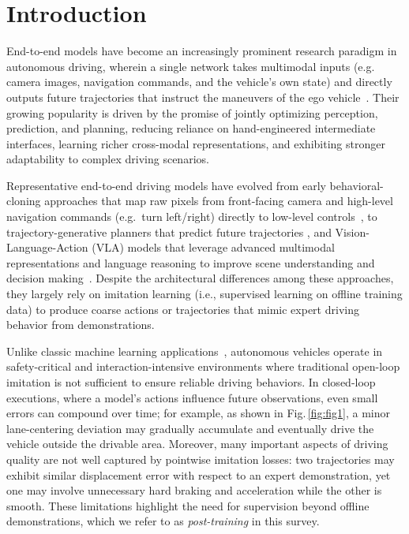 \documentclass[runningheads]{llncs}
\begin{document}
\section{Introduction}
\label{sec:intro}

End-to-end models have become an increasingly prominent research paradigm in autonomous driving, wherein a single network takes multimodal inputs (e.g.\, camera images, navigation commands, and the vehicle's own state) and directly outputs future trajectories that instruct the maneuvers of the ego vehicle~\cite{hu2023planning,jiang2023vad,ma2025leapvad}.
Their growing popularity is driven by the promise of jointly optimizing perception, prediction, and planning,
reducing reliance on hand-engineered intermediate interfaces, learning richer cross-modal representations, and exhibiting stronger adaptability to complex driving scenarios.


Representative end-to-end driving models have evolved from early behavioral-cloning approaches that map raw pixels from front-facing camera and high-level navigation commands (e.g.~turn left/right) directly to low-level controls~\cite{bojarski2016end,codevilla2018end}, to trajectory-generative planners that predict future trajectories \cite{chitta2022transfuser,jia2023think,hdp2026,plannerrft2026,driveanchor2026,eponav2_2026}, and Vision-Language-Action (VLA) models that leverage advanced
multimodal representations and language reasoning to improve scene understanding and decision making~\cite{alpamayo2025,autodriver2_2025,autodrivep3_2026,reasoningvla2025}. Despite the architectural differences among these approaches, they largely rely on imitation learning (i.e., supervised learning on offline training data) to produce coarse actions or trajectories that mimic expert driving behavior from demonstrations. 




Unlike classic machine learning applications~\cite{yao2026bipartite,yang2026tp}, autonomous vehicles operate in safety-critical and interaction-intensive environments where traditional open-loop imitation is not sufficient to ensure reliable driving behaviors. 
In closed-loop executions, where a model's actions influence future observations, even small errors can compound over time; for example, as shown in Fig.\,\ref{fig:fig1}, a minor lane-centering deviation may gradually accumulate and eventually drive the vehicle outside the drivable area.  
Moreover, many important aspects of driving quality are not well captured by pointwise imitation losses: two trajectories may exhibit similar displacement error with respect to an expert demonstration, yet one may involve unnecessary hard braking and acceleration while the other is smooth. These limitations highlight the need for supervision beyond offline demonstrations, which we refer to as {\em post-training} in this survey. 
\end{document}
